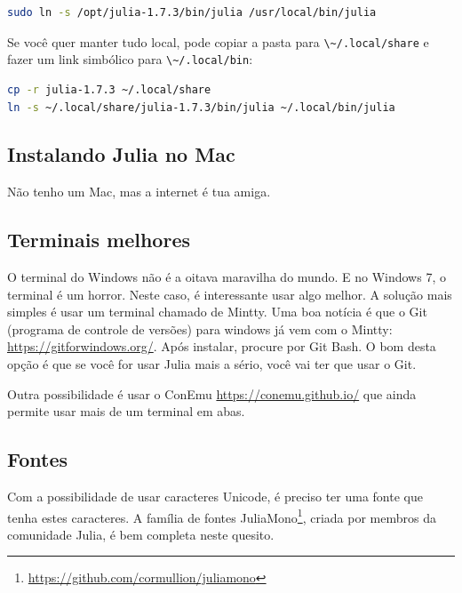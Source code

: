\documentclass[
  notoc %
]{tufte-book}
\DeclareRobustCommand{\href}[2]{#2\footnote{\url{#1}}}
\newcommand{\passthrough}[1]{#1}
\begin{document}
\begin{lstlisting}[language=bash]
sudo ln -s /opt/julia-1.7.3/bin/julia /usr/local/bin/julia
\end{lstlisting}

Se você quer manter tudo local, pode copiar a pasta para
\passthrough{\lstinline!\~/.local/share!} e fazer um link simbólico para
\passthrough{\lstinline!\~/.local/bin!}:

\begin{lstlisting}[language=bash]
cp -r julia-1.7.3 ~/.local/share
ln -s ~/.local/share/julia-1.7.3/bin/julia ~/.local/bin/julia
\end{lstlisting}

\hypertarget{instalando-julia-no-mac}{%
\subsection{Instalando Julia no Mac}\label{instalando-julia-no-mac}}

Não tenho um Mac, mas a internet é tua amiga.

\hypertarget{terminais-melhores}{%
\subsection{Terminais melhores}\label{terminais-melhores}}

O terminal do Windows não é a oitava maravilha do mundo. E no Windows 7,
o terminal é um horror. Neste caso, é interessante usar algo melhor. A
solução mais simples é usar um terminal chamado de Mintty. Uma boa
notícia é que o Git (programa de controle de versões) para windows já
vem com o Mintty: \url{https://gitforwindows.org/}. Após instalar,
procure por Git Bash. O bom desta opção é que se você for usar Julia
mais a sério, você vai ter que usar o Git.

Outra possibilidade é usar o ConEmu \url{https://conemu.github.io/} que
ainda permite usar mais de um terminal em abas.

\hypertarget{fontes}{%
\subsection{Fontes}\label{fontes}}

Com a possibilidade de usar caracteres Unicode, é preciso ter uma fonte
que tenha estes caracteres.
\href{https://github.com/cormullion/juliamono}{A família de fontes
JuliaMono}, criada por membros da comunidade Julia, é bem completa neste
quesito.
\end{document}
